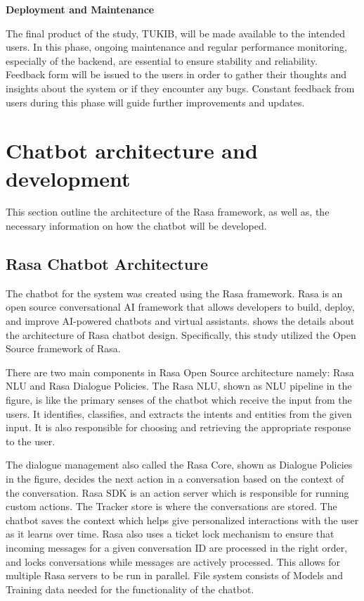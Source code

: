 \textbf{Deployment and Maintenance}

The final product of the study, TUKIB, will be made available to the intended users. In this phase, ongoing maintenance and regular performance monitoring, especially of the backend, are essential to ensure stability and reliability. Feedback form will be issued to the users in order to gather their thoughts and insights about the system or if they encounter any bugs. Constant feedback from users during this phase will guide further improvements and updates.

\section{Chatbot architecture and development}

This section outline the architecture of the Rasa framework, as well as, the necessary information on how the chatbot will be developed.

\subsection{Rasa Chatbot Architecture}

The chatbot for the system was created using the Rasa framework. Rasa is an open source conversational AI framework that allows developers to build, deploy, and improve AI-powered chatbots and virtual assistants.  shows the details about the architecture of Rasa chatbot design. Specifically, this study utilized the Open Source framework of Rasa.

There are two main components in Rasa Open Source architecture namely: Rasa NLU and Rasa Dialogue Policies. The Rasa NLU, shown as NLU pipeline in the figure, is like the primary senses of the chatbot which receive the input from the users. It identifies, classifies, and extracts the intents and entities from the given input. It is also responsible for choosing and retrieving the appropriate response to the user. 

The dialogue management also called the Rasa Core, shown as Dialogue Policies in the figure, decides the next action in a conversation based on the context of the conversation. Rasa SDK is an action server which is responsible for running custom actions. The Tracker store is where the conversations are stored. The chatbot saves the context which helps give personalized interactions with the user as it learns over time. Rasa also uses a ticket lock mechanism to ensure that incoming messages for a given conversation ID are processed in the right order, and locks conversations while messages are actively processed. This allows for multiple Rasa servers to be run in parallel. File system consists of Models and Training data needed for the functionality of the chatbot.

